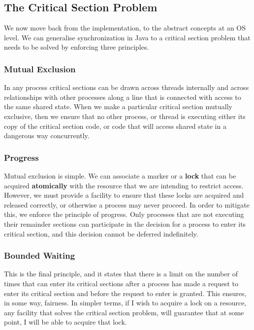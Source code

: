 \documentclass[10pt,a4paper]{article}
\begin{document}
\subsection{The Critical Section Problem}
We now move back from the implementation, to the abstract concepts at an OS level. We can generalise synchronization in Java to a critical section problem that needs to be solved by enforcing three principles.  
\subsubsection{Mutual Exclusion}
In any process critical sections can be drawn across threads internally and across relationships with other processes along a line that is connected with access to the same shared state. When we make a particular critical section mutually exclusive, then we ensure that no other process, or thread is executing either its copy of the critical section code, or code that will access shared state in a dangerous way concurrently. 
\subsubsection{Progress}
Mutual exclusion is simple. We can associate a marker or a {\bf lock} that can be acquired {\bf atomically} with the resource that we are intending to restrict access. However, we must provide a facility to ensure that these locks are acquired and released correctly, or otherwise a process may never proceed. In order to mitigate this, we enforce the principle of progress. Only processes that are not executing their remainder sections can participate in the decision for a process to enter its critical section, and this decision cannot be deferred indefinitely. 
\subsubsection{Bounded Waiting}
This is the final principle, and it states that there is a limit on the number of times that can enter its critical sections after a process has made a request to enter its critical section and before the request to enter is granted. This ensures, in some way, fairness. In simpler terms, if I wish to acquire a lock on a resource, any facility that solves the critical section problem, will guarantee that at some point, I will be able to acquire that lock. 
\end{document}
